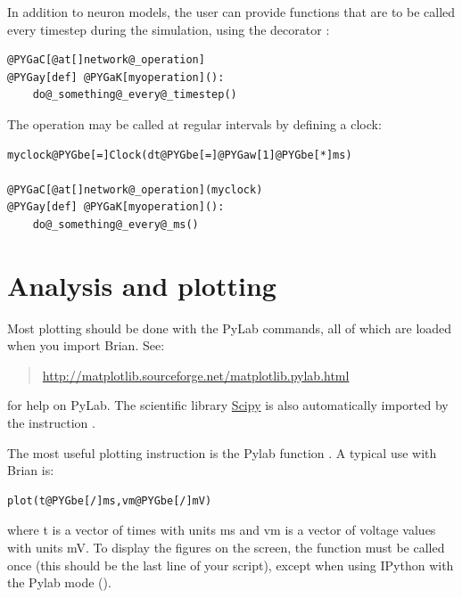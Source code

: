 \documentclass[letterpaper,10pt,english]{manual}
\begin{document}
In addition to neuron models, the user can provide functions that are to be called every timestep
during the simulation, using the decorator \hyperlink{brian.network_operation}{}:

\begin{Verbatim}[commandchars=@\[\]]
@PYGaC[@at[]network@_operation]
@PYGay[def] @PYGaK[myoperation]():
    do@_something@_every@_timestep()
\end{Verbatim}

The operation may be called at regular intervals by defining a clock:

\begin{Verbatim}[commandchars=@\[\]]
myclock@PYGbe[=]Clock(dt@PYGbe[=]@PYGaw[1]@PYGbe[*]ms)

@PYGaC[@at[]network@_operation](myclock)
@PYGay[def] @PYGaK[myoperation]():
    do@_something@_every@_ms()
\end{Verbatim}

\resetcurrentobjects
{}

\hypertarget{index-0}{}\section{Analysis and plotting}
Most plotting should be done with the PyLab commands, all of
which are loaded when you import Brian. See:
\begin{quote}

\href{http://matplotlib.sourceforge.net/matplotlib.pylab.html}{http://matplotlib.sourceforge.net/matplotlib.pylab.html}
\end{quote}

for help on PyLab. The scientific library \href{http://www.scipy.org}{Scipy} is also automatically
imported by the instruction .

The most useful plotting instruction is the Pylab function . A typical use with Brian is:

\begin{Verbatim}[commandchars=@\[\]]
plot(t@PYGbe[/]ms,vm@PYGbe[/]mV)
\end{Verbatim}

where t is a vector of times with units ms and vm is a vector of voltage values with units mV.
To display the figures on the screen, the function  must be called once (this should be the
last line of your script), except when using IPython with the Pylab mode ().
\end{document}
